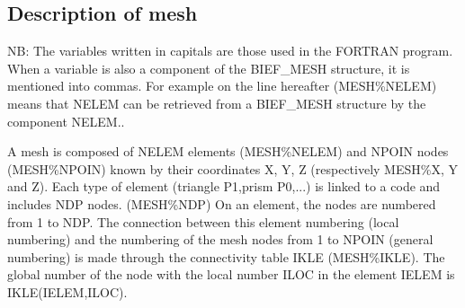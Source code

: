 \subsection{Description of mesh}

NB: The variables written in capitals are those used in the \bief FORTRAN
program. When a variable is also a component of the BIEF\_MESH structure, it is
mentioned into commas. For example on the line hereafter (MESH\%NELEM) means
that NELEM can be retrieved from a BIEF\_MESH structure by the component
NELEM..

A mesh is composed of NELEM elements (MESH\%NELEM) and NPOIN nodes
(MESH\%NPOIN) known by their coordinates X, Y, Z (respectively MESH\%X, Y and
Z). Each type of element (triangle P1,prism P0,...) is linked to a code and
includes NDP nodes. (MESH\%NDP) On an element, the nodes are numbered from 1 to
NDP. The connection between this element numbering (local numbering) and the
numbering of the mesh nodes from 1 to NPOIN (general numbering) is made through
the connectivity table IKLE (MESH\%IKLE). The global number of the node with
the local number ILOC in the element IELEM is IKLE(IELEM,ILOC).

